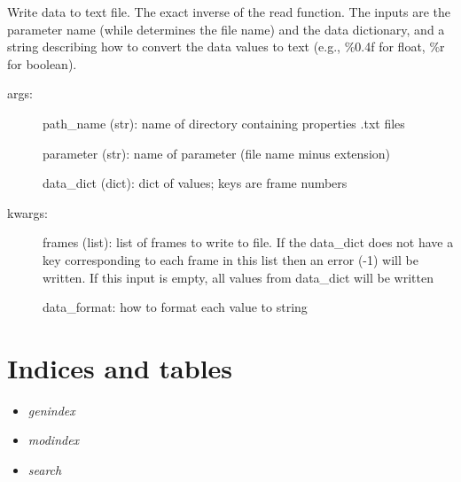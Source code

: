 \documentclass[letterpaper,10pt,openany,oneside]{sphinxmanual}
\begin{document}
\begin{fulllineitems}
\label{index:readwrite.writetxt}
Write data to text file. The exact inverse of the read function.
The inputs are the parameter name (while determines the file name)
and the data dictionary, and a string describing how to convert
the data values to text (e.g., \%0.4f for float, \%r for boolean).
\begin{description}
\item[{args:}] \leavevmode
path\_name (str): name of directory containing properties .txt files

parameter (str): name of parameter (file name minus extension)

data\_dict (dict): dict of values; keys are frame numbers

\item[{kwargs:}] \leavevmode
frames (list): list of frames to write to file. If the data\_dict does 
not have a key corresponding to each frame in this list then an 
error (-1) will be written. If this input is empty, all values 
from data\_dict will be written

data\_format: how to format each value to string

\end{description}

\end{fulllineitems}



\chapter{Indices and tables}
\label{index:indices-and-tables}\begin{itemize}
\item {} 
\emph{genindex}

\item {} 
\emph{modindex}

\item {} 
\emph{search}

\end{itemize}
\end{document}
